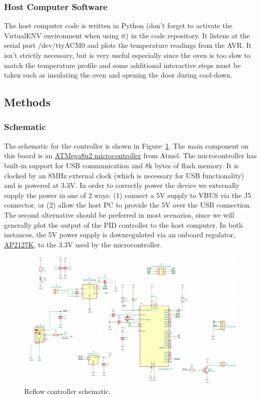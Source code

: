 \documentclass[11pt,twoside,a4paper]{report}
\begin{document}
\subsubsection{Host Computer Software}
The host computer code is written in Python (don't forget to activate the VirtualENV environment
when using it) in the code repository. It listens at the serial port /dev/ttyACM0 and plots the
temperature readings from the AVR. It isn't strictly necessary, but is very useful especially since
the oven is too slow to match the temperature profile and some additional interactive steps must be
taken such as insulating the oven and opening the door during cool-down.

\subsection{Methods}

\subsubsection{Schematic}
The schematic for the controller is shown in Figure~\ref{fig:reflow-controller-sch}. The main
component on this board is an
\href{http://ww1.microchip.com/downloads/en/DeviceDoc/doc7799.pdf}{ATMega8u2 microcontroller} from
Atmel. The microcontroller has built-in support for USB communication and 8k bytes of flash
memory. It is clocked by an 8MHz external clock (which is necessary for USB functionality) and is
powered at 3.3V. In order to correctly power the device we externally supply the power in one of 2
ways: (1) connect a 5V supply to VBUS via the J5 connector, or (2) allow the host PC to provide the
5V over the USB connection. The second alternative should be preferred in most scenarios, since we
will generally plot the output of the PID controller to the host computer. In both instances, the 5V
power supply is downregulated via an onboard regulator,
\href{https://www.diodes.com/assets/Datasheets/AP2127.pdf}{AP2127K}, to the 3.3V used by the
microcontroller.\newline

\begin{figure}[h]
  \centering
  \includegraphics[width=\textwidth]{data/reflow-controller-sch.png}
  \caption{Reflow controller schematic.}
  \label{fig:reflow-controller-sch}
\end{figure}
\end{document}
